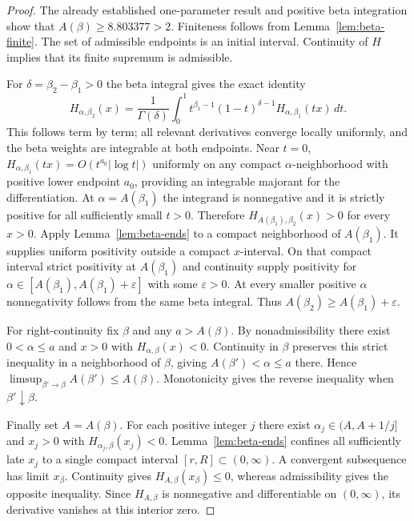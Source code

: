 \documentclass[11pt,a4paper]{article}
\theoremstyle{plain}
\theoremstyle{remark}
\begin{document}
\begin{proof}
The already established one-parameter result and positive beta integration
show that $A(\beta)\geq8.803377>2$. Finiteness follows from
Lemma~\ref{lem:beta-finite}. The set of admissible endpoints is an initial
interval. Continuity of $H$ implies that its finite supremum is admissible.

For $\delta=\beta_2-\beta_1>0$ the beta integral gives the exact identity
\[
 H_{\alpha,\beta_2}(x)=\frac1{\Gamma(\delta)}
 \int_0^1 t^{\beta_1-1}(1-t)^{\delta-1}
                    H_{\alpha,\beta_1}(tx)\,dt.
\]
This follows term by term; all relevant derivatives converge locally
uniformly, and the beta weights are integrable at both endpoints. Near $t=0$,
$H_{\alpha,\beta_1}(tx)=O(t^{a_0}|\log t|)$ uniformly on any compact
$\alpha$-neighborhood with positive lower endpoint $a_0$, providing an
integrable majorant for the differentiation.
At $\alpha=A(\beta_1)$ the integrand is nonnegative and it is strictly
positive for all sufficiently small $t>0$. Therefore
$H_{A(\beta_1),\beta_2}(x)>0$ for every $x>0$.
Apply Lemma~\ref{lem:beta-ends} to a compact neighborhood of $A(\beta_1)$.
It supplies uniform positivity outside a compact $x$-interval. On that
compact interval strict positivity at $A(\beta_1)$ and continuity supply
positivity for $\alpha\in[A(\beta_1),A(\beta_1)+\varepsilon]$ with some
$\varepsilon>0$. At every smaller positive $\alpha$ nonnegativity follows
from the same beta integral. Thus
$A(\beta_2)\geq A(\beta_1)+\varepsilon$.

For right-continuity fix $\beta$ and any $a>A(\beta)$. By nonadmissibility
there exist $0<\alpha\leq a$ and $x>0$ with
$H_{\alpha,\beta}(x)<0$. Continuity in $\beta$ preserves this strict
inequality in a neighborhood of $\beta$, giving
$A(\beta')<\alpha\leq a$ there. Hence
$\limsup_{\beta'\to\beta}A(\beta')\leq A(\beta)$.
Monotonicity gives the reverse inequality when $\beta'\downarrow\beta$.

Finally set $A=A(\beta)$. For each positive integer $j$ there exist
$\alpha_j\in(A,A+1/j]$ and $x_j>0$ with
$H_{\alpha_j,\beta}(x_j)<0$.
Lemma~\ref{lem:beta-ends} confines all sufficiently late $x_j$ to a single
compact interval $[r,R]\subset(0,\infty)$. A convergent subsequence has
limit $x_\beta$. Continuity gives $H_{A,\beta}(x_\beta)\leq0$, whereas
admissibility gives the opposite inequality. Since $H_{A,\beta}$ is
nonnegative and differentiable on $(0,\infty)$, its derivative vanishes at
this interior zero.
\end{proof}
\end{document}
